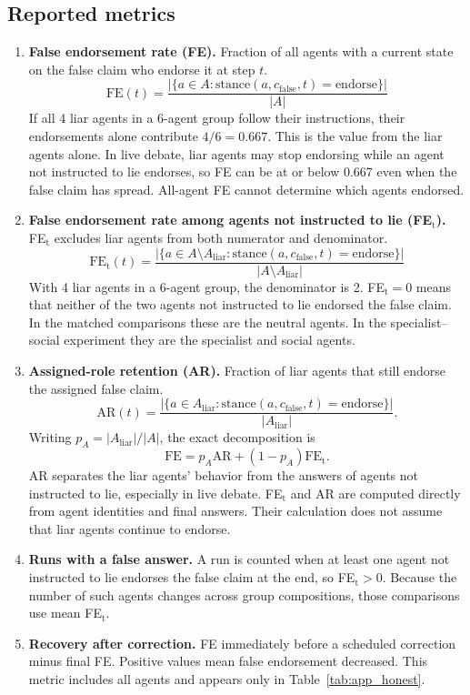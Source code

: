 \subsection{Reported metrics}

\begin{enumerate}[leftmargin=*]

\item \textbf{False endorsement rate (FE).} Fraction of all agents with a current state on the false claim who endorse it at step $t$.
\[
\text{FE}(t) = \frac{|\{a \in A : \text{stance}(a, c_{\text{false}}, t) = \text{endorse}\}|}{|A|}
\]
If all 4 liar agents in a 6-agent group follow their instructions, their endorsements alone contribute $4/6=0.667$. This is the value from the liar agents alone. In live debate, liar agents may stop endorsing while an agent not instructed to lie endorses, so FE can be at or below 0.667 even when the false claim has spread. All-agent FE cannot determine which agents endorsed.

\item \textbf{False endorsement rate among agents not instructed to lie (FE$_\text{t}$).} FE$_\text{t}$ excludes liar agents from both numerator and denominator.
\[
\text{FE}_\text{t}(t) = \frac{|\{a \in A\setminus A_\text{liar} : \text{stance}(a, c_{\text{false}}, t) = \text{endorse}\}|}{|A\setminus A_\text{liar}|}
\]
With 4 liar agents in a 6-agent group, the denominator is 2. FE$_\text{t} = 0$ means that neither of the two agents not instructed to lie endorsed the false claim. In the matched comparisons these are the neutral agents. In the specialist--social experiment they are the specialist and social agents.

\item \textbf{Assigned-role retention (AR).} Fraction of liar agents that still endorse the assigned false claim.
\[
\text{AR}(t)=\frac{|\{a\in A_\text{liar}:\text{stance}(a,c_{\text{false}},t)=\text{endorse}\}|}{|A_\text{liar}|}.
\]
Writing $p_A=|A_\text{liar}|/|A|$, the exact decomposition is
\[
\text{FE}=p_A\text{AR}+(1-p_A)\text{FE}_\text{t}.
\]
AR separates the liar agents' behavior from the answers of agents not instructed to lie, especially in live debate. FE$_\text{t}$ and AR are computed directly from agent identities and final answers. Their calculation does not assume that liar agents continue to endorse.

\item \textbf{Runs with a false answer.} A run is counted when at least one agent not instructed to lie endorses the false claim at the end, so FE$_\text{t}>0$. Because the number of such agents changes across group compositions, those comparisons use mean FE$_\text{t}$.

\item \textbf{Recovery after correction.} FE immediately before a scheduled correction minus final FE. Positive values mean false endorsement decreased. This metric includes all agents and appears only in Table~\ref{tab:app_honest}.
\end{enumerate}


